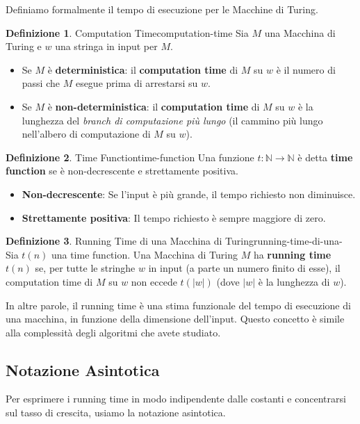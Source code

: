 \documentclass[a4paper]{article}
\theoremstyle{definition} %
\newtheorem{definition}{Definizione}[section]
\begin{document}
Definiamo formalmente il tempo di esecuzione per le Macchine di Turing.

\begin{definition}{Computation Time}{computation-time}
Sia $M$ una Macchina di Turing e $w$ una stringa in input per $M$.
\begin{itemize}
    \item Se $M$ è \textbf{deterministica}: il \textbf{computation time} di $M$ su $w$ è il numero di passi che $M$ esegue prima di arrestarsi su $w$.
    \item Se $M$ è \textbf{non-deterministica}: il \textbf{computation time} di $M$ su $w$ è la lunghezza del \emph{branch di computazione più lungo} (il cammino più lungo nell'albero di computazione di $M$ su $w$).
\end{itemize}
\end{definition}

\begin{definition}{Time Function}{time-function}
Una funzione $t: \mathbb{N} \to \mathbb{N}$ è detta \textbf{time function} se è non-decrescente e strettamente positiva.
\begin{itemize}
    \item \textbf{Non-decrescente}: Se l'input è più grande, il tempo richiesto non diminuisce.
    \item \textbf{Strettamente positiva}: Il tempo richiesto è sempre maggiore di zero.
\end{itemize}
\end{definition}

\begin{definition}{Running Time di una Macchina di Turing}{running-time-di-una-}
Sia $t(n)$ una time function. Una Macchina di Turing $M$ ha \textbf{running time} $t(n)$ se, per tutte le stringhe $w$ in input (a parte un numero finito di esse), il computation time di $M$ su $w$ non eccede $t(|w|)$ (dove $|w|$ è la lunghezza di $w$).
\end{definition}
In altre parole, il running time è una stima funzionale del tempo di esecuzione di una macchina, in funzione della dimensione dell'input. Questo concetto è simile alla complessità degli algoritmi che avete studiato.

\subsection{Notazione Asintotica}
Per esprimere i running time in modo indipendente dalle costanti e concentrarsi sul tasso di crescita, usiamo la notazione asintotica.
\end{document}
